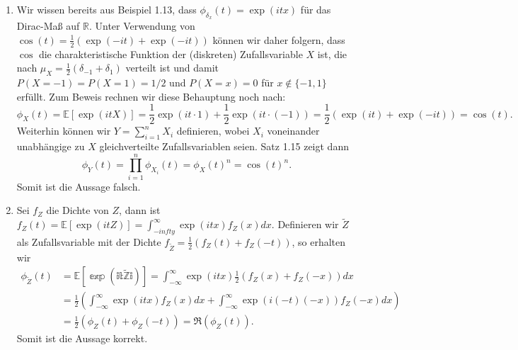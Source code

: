 \documentclass[a4paper]{article}
\begin{document}
\begin{enumerate}
	\item Wir wissen bereits aus Beispiel 1.13, dass $\phi_{\delta_x}(t) = \exp(i t x)$ für das Dirac-Maß auf $\mathds{R}$. Unter Verwendung von $\cos(t) = \frac{1}{2} (\exp(-it) + \exp(-it))$ können wir daher folgern, dass $\cos$ die charakteristische Funktion der (diskreten) Zufallsvariable $X$ ist, die nach $\mu_X = \frac{1}{2}(\delta_{-1} + \delta_{1})$ verteilt ist und damit $P(X = -1) = P(X=1) = 1/2$ und $P(X = x) = 0$ für $x \notin \{-1,1\}$ erfüllt. Zum Beweis rechnen wir diese Behauptung noch nach:
	      \begin{equation*}
		      \phi_X(t) = \mathds{E}[\exp(itX)] = \frac{1}{2} \exp(it\cdot 1) + \frac{1}{2} \exp(it \cdot (-1)) = \frac{1}{2} (\exp(it) + \exp(-it))  = \cos(t)\text{.}
	      \end{equation*}
	      Weiterhin können wir $Y = \sum_{i = 1}^{n} X_i$ definieren, wobei $X_i$ voneinander unabhängige zu $X$ gleichverteilte Zufallsvariablen seien. Satz 1.15 zeigt dann
	      \begin{equation*}
		      \phi_Y(t) = \prod_{i=1}^{n} \phi_{X_i}(t) = \phi_X(t)^n = \cos(t)^n\text{.}
	      \end{equation*}
	      Somit ist die Aussage falsch.
	\item Sei $f_Z$ die Dichte von $Z$, dann ist $f_Z(t) = \mathds{E}[\exp(itZ)] = \int_{-infty}^{\infty} \exp(itx) f_Z(x) dx$. Definieren wir $\tilde Z$ als Zufallsvariable mit der Dichte $f_{\tilde Z} = \frac{1}{2} (f_Z(t) + f_Z(-t))$, so erhalten wir
	      \begin{align*}
		      \phi_{\tilde Z}(t) & = \mathds{E[\exp(it\tilde Zi)]} = \int_{-\infty}^{\infty} \exp(itx) \frac{1}{2} (f_Z(x) + f_Z(-x)) dx                           \\
		                         & = \frac{1}{2} \left( \int_{-\infty}^{\infty} \exp(itx)  f_Z(x) dx + \int_{-\infty}^{\infty} \exp(i(-t)(-x))  f_Z(-x) dx \right) \\
		                         & = \frac{1}{2} \left( \phi_Z(t) + \phi_Z(-t) \right) = \Re(\phi_Z(t))\text{.}
	      \end{align*}
	      Somit ist die Aussage korrekt.
\end{enumerate}
\end{document}

